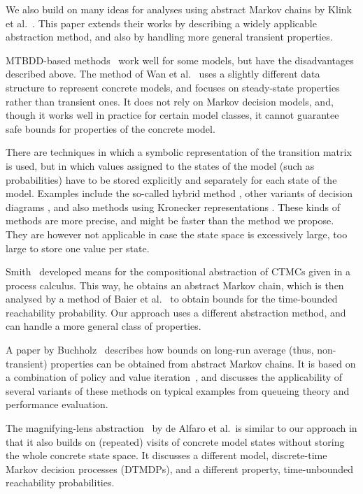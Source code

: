 \documentclass[10pt,twocolumn]{article}
\begin{document}
We also build on many ideas for analyses using abstract Markov chains
by Klink et al.~\cite{Klink10,KatoenKLW07}. This paper extends their
works by describing a widely applicable abstraction method, and also
by handling more general transient properties.

MTBDD-based methods~\cite{Parker02,HermannsKNPS03} work well for some
models, but have the disadvantages described above.
The method of Wan et al.~\cite{WanCM11} uses a slightly different data
structure to represent concrete models, and focuses on steady-state
properties rather than transient ones. It does not rely on Markov
decision models, and, though it works well in practice for certain
model classes, it cannot guarantee safe bounds for properties of the
concrete model.

There are techniques in which a symbolic representation of the transition
matrix is used, but in which values assigned to the states of the model
(such as probabilities) have to be stored explicitly and separately for
each state of the model. Examples include the so-called hybrid method
\cite{Parker02,KwiatkowskaNP04}, other variants of decision diagrams
\cite{LampkaSOB10}, and also methods using Kronecker representations
\cite{Dayar12,BuchholzCDK00,BenoitPS06,FernandesPS98,BuchholzK04}.
These kinds of methods are more precise, and might be faster than the
method we propose. They are however not applicable in case the state space
is excessively large, too large to store one value per state.

Smith~\cite{Smith10} developed means for the compositional abstraction
of CTMCs given in a process calculus. This way, he obtains an
abstract Markov chain, which is then analysed by a method of Baier et
al.~\cite{BaierHKH05} to obtain bounds for the time-bounded
reachability probability. Our approach uses a different abstraction
method, and can handle a more general class of properties.

A paper by Buchholz~\cite{Buchholz11} describes how bounds on long-run
average (thus, non-transient) properties can be obtained from abstract
Markov chains. It is based on a combination of policy and value
iteration~\cite{Puterman94}, and discusses the applicability of
several variants of these methods on typical examples from queueing
theory and performance evaluation.

The magnifying-lens abstraction~\cite{AlfaroR07} by de Alfaro et
al.~is similar to our approach in that it also builds on (repeated)
visits of concrete model states without storing the whole concrete
state space. It discusses a different model, discrete-time Markov
decision processes (DTMDPs), and a different property, time-unbounded
reachability probabilities.
\end{document}
